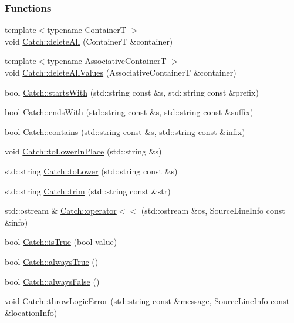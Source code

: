 \subsubsection*{Functions}
\begin{DoxyCompactItemize}
\item 
{\footnotesize template$<$typename Container\+T $>$ }\\void \hyperlink{a00117_aadf9786550a462740ec355f8219863a9}{Catch\+::delete\+All} (Container\+T \&container)
\item 
{\footnotesize template$<$typename Associative\+Container\+T $>$ }\\void \hyperlink{a00117_af2fcec1d4bd984fe19ff8b9a432c36a8}{Catch\+::delete\+All\+Values} (Associative\+Container\+T \&container)
\item 
bool \hyperlink{a00117_a695f62327be0676e046291eeaae15110}{Catch\+::starts\+With} (std\+::string const \&s, std\+::string const \&prefix)
\item 
bool \hyperlink{a00117_ada025504f627feaf9ac68ca391515dff}{Catch\+::ends\+With} (std\+::string const \&s, std\+::string const \&suffix)
\item 
bool \hyperlink{a00117_aa52974b0e426e7e2fbd725a900e9c36e}{Catch\+::contains} (std\+::string const \&s, std\+::string const \&infix)
\item 
void \hyperlink{a00117_a0760dbe87d090a55a35414db57d272c4}{Catch\+::to\+Lower\+In\+Place} (std\+::string \&s)
\item 
std\+::string \hyperlink{a00117_ac036a17412d318598ffda8e1fe7a1177}{Catch\+::to\+Lower} (std\+::string const \&s)
\item 
std\+::string \hyperlink{a00117_a084108b47f37d8bfd5db51c50c7451b3}{Catch\+::trim} (std\+::string const \&str)
\item 
std\+::ostream \& \hyperlink{a00117_a6ec18b5054d7fdfdde861c580b082995}{Catch\+::operator$<$$<$} (std\+::ostream \&os, Source\+Line\+Info const \&info)
\item 
bool \hyperlink{a00117_ae3bc6c6677e64e6eaa720dc3add31852}{Catch\+::is\+True} (bool value)
\item 
bool \hyperlink{a00117_a129be2186a2f6546206ec52c4bf2156f}{Catch\+::always\+True} ()
\item 
bool \hyperlink{a00117_ad425271249dd02956a9709e78b8b2783}{Catch\+::always\+False} ()
\item 
void \hyperlink{a00117_a702b612f683d154c466ea8297ed4a20d}{Catch\+::throw\+Logic\+Error} (std\+::string const \&message, Source\+Line\+Info const \&location\+Info)

\end{DoxyCompactItemize}
